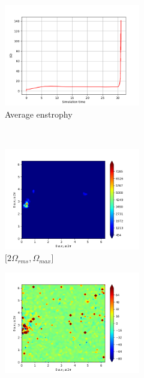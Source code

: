 \begin{figure}[H]
    \begin{subfigure}[H]{0.45\textwidth}
        \includegraphics[height=1.75in]{media/run-cds-65/enst-average1480.png}
        \caption{Average enstrophy}
    \end{subfigure}
    ~
    \begin{subfigure}[H]{0.45\textwidth}
        \includegraphics[height=1.75in]{media/run-cds-65/enst-2-1480.png}
        \caption{$[2\Omega_{rms}, \Omega_{max} $] }
    \end{subfigure}
    \newline
    \begin{subfigure}[H]{0.45\textwidth}
        \includegraphics[height=1.75in]{media/run-cds-65/enst-1480.png}

\end{subfigure}
\end{figure}
